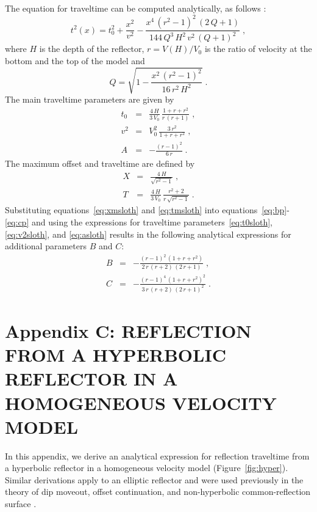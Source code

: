 The equation for traveltime can be computed analytically, as follows
\cite[]{cerveny}:
\begin{equation}
  t^2(x) = t_0^2 + \frac{x^2}{v^2} - 
  \frac{x^4\,(r^2-1)^2\,(2\,Q+1)}{144\,Q^3\,H^2\,v^2\,(Q+1)^2}\;,
\end{equation}
where $H$ is the depth of the reflector, $r=V(H)/V_0$ is the
ratio of velocity at the bottom and the top of the model and
\[
Q = \sqrt{1-\frac{x^2\,(r^2-1)^2}{16\,r^2\,H^2}}\;.
\]
The main traveltime parameters are given by
\begin{eqnarray}
  \label{eq:t0sloth}
  t_0 & = & \frac{4\,H}{3\,V_0}\,\frac{1+r+r^2}{r\,(r+1)}\;, \\
  \label{eq:v2sloth}
  v^2 & = & V_0^2\,\frac{3\,r^2}{1+r+r^2}\;, \\
  \label{eq:asloth}
  A & = & -\frac{(r-1)^2}{6\,r}\;.
\end{eqnarray}
The maximum offset and traveltime are defined by
\begin{eqnarray}
  \label{eq:xmsloth}
  X & = & \frac{4\,H}{\sqrt{r^2-1}}\;, \\
  \label{eq:tmsloth}
  T & = & \frac{4\,H}{3\,V_0}\,\frac{r^2+2}{r\,\sqrt{r^2-1}}\;.
\end{eqnarray}
Substituting equations~\ref{eq:xmsloth} and \ref{eq:tmsloth} into
equations~\ref{eq:bp}-\ref{eq:cp} and using the expressions for
traveltime parameters~\ref{eq:t0sloth}, \ref{eq:v2sloth}, and
\ref{eq:asloth} results in the following analytical expressions for
additional parameters $B$ and $C$:
\begin{eqnarray}
\label{eq:bsloth}
B & = & - \frac{(r-1)^2\,(1+r+r^2)}{2\,r\,(r+2)\,(2\,r+1)}\;, \\
\label{eq:csloth}
C & = & - \frac{(r-1)^4\,(1+r+r^2)^2}{3\,r\,(r+2)\,(2\,r+1)^2}\;.
\end{eqnarray}

\appendix
\section{Appendix C: REFLECTION FROM A HYPERBOLIC REFLECTOR IN A HOMOGENEOUS VELOCITY MODEL}

In this appendix, we derive an analytical expression for reflection
traveltime from a hyperbolic reflector in a homogeneous velocity
model (Figure~\ref{fig:hyper}). Similar derivations apply to an elliptic reflector and were
used previously in the theory of dip moveout, offset continuation, and
non-hyperbolic common-reflection surface
\cite[]{stovas,GEO68-02-07180732,crs}.

